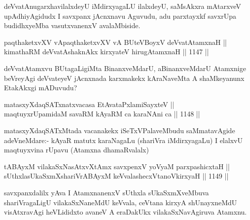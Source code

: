 \begin{artha}
deVvatAnugarxhavilalxdeyU iMdirxyagaLU ilalxdeyU, saMsAkxra mAtarxveV upAdhiyAgidudx I savxpanx jAcnxnavu Aguvudu, adu parxtayxkf savxrUpa budidhxyeMba vasutxvanenxV avalaMbiside.
\end{artha}


\begin{shl}
paqthaketxvXV vA\s paqthaketxvXV vA BUteVBoyxV deVvatAtamxnaH ||  \\
kimathaRM deVvatAshaknAkx kirxyateV hirugAtamxnaH ||  1147 ||  
\end{shl}

\begin{artha}
deVvatAtamxvu BUtagaLigiMta BinanxveMdarU, aBinanxveMdarU Atamxnige beVreyAgi deVvateyeV jAcnxnada karxmakekx kAraNaveMta A shaMkeyanunx EtakAkxgi mADuvudu?
\end{artha}


\begin{shl}
matasxyXdaqSATxnatxvacasa EtAvataPxlamiSayxteV || \\
maqtuyxrUpamidaM savaRM kAyaRM ca karaNAni ca ||  1148 ||  
\end{shl}

\begin{artha}
matasxyXdaqSATxMtada vacanakekx iSeTxVPalaveMbudu saMmatavAgide adeVneMdare:- kAyaR matutx karaNagaLu (shariVra iMdirxyagaLu) I elalxvU maqtuyxvina rUpavu (Atamxna dhamaRvalalx)
\end{artha}

\begin{shl}
tABAyxM vilakaSxNasAtxvXtAmx savxpenxV yoV\s yaM parxpashicxtaH || \\
sUthxlasUkaSxmXshariVrABAyxM keVvalashecxVtanoV\s kirxyaH ||  1149 ||  
\end{shl}

\begin{artha}
savxpanxdalilx yAva I AtamxnanenxV sUthxla sUkaSxmXveMbuva shariVragaLigU vilakaSxNaneMdU keVvala, ceVtana kirxyA shUnayxneMdU visAtxravAgi heVLididxto avaneV A eraDakUkx vilakaSxNavAgiruva Atamxnu.
\end{artha}


